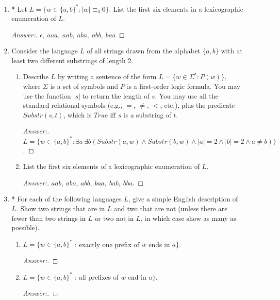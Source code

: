 \documentclass[10pt]{article}
\newcommand{\card}[1]{\left| #1 \right|}
\begin{document}
\begin{enumerate}

\item
* Let $L = \{w \in \{a, b\}^* : \card{w} \equiv _3 0\}$.  List the first six elements in a lexicographic enumeration of $L$.
\begin{proof}[Answer:]
$\epsilon,\ aaa,\ aab,\ aba,\ abb,\ baa$ 
\end{proof}


\pagebreak

\item
Consider the language $L$ of all strings drawn from the alphabet $\{a, b\}$ with at least two different substrings of length 2.
\begin{enumerate}

\item
Describe $L$ by writing a sentence of the form $L = \{w \in \Sigma ^* : P(w)\}$, where $\Sigma$ is a set of symbols and $P$ is a first-order logic formula.  You may use the function $\card{s}$ to return the length of $s$.  You may use all the standard relational symbols (e.g., $=$,  $\neq$, $<$, etc.), plus the predicate  $Substr(s,  t)$, which is $True$ iff $s$ is a substring of $t$.
\begin{proof}[Answer:]
$L = \{w \in \{a, b\}^* : \exists a\ \exists b (Substr(a, w) \land Substr(b, w) \land \card{a} = 2 \land \card{b} = 2 \land a \neq b)\}$.
\end{proof}

\item
List the first six elements of a lexicographic enumeration of $L$.
\begin{proof}[Answer:]
$aab,\ aba,\ abb,\ baa,\ bab,\ bba$.
\end{proof}
\end{enumerate}


\item
* For each of the following languages $L$, give a simple English description of $L$.  Show two strings that are in $L$ and two that are not (unless there are fewer than two strings in $L$ or two not in $L$, in which case show as many as possible).
\begin{enumerate}

\item
$L = \{w \in \{a, b\}^*$ : exactly one prefix of $w$ ends in $a\}$. 
\begin{proof}[Answer:]
\end{proof}

\item
$L = \{w \in \{a, b\}^*$ : all prefixes of $w$ end in $a\}$.
\begin{proof}[Answer:]
\end{proof}


\end{enumerate}
\end{enumerate}
\end{document}
